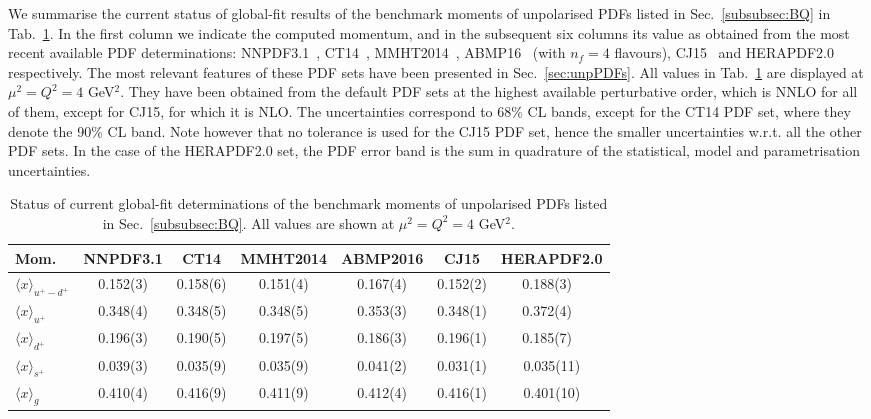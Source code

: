 We summarise the current status of global-fit results of the benchmark
moments of unpolarised PDFs listed in Sec.~\ref{subsubsec:BQ} 
in Tab.~\ref{tab:unpPDFmoms}.
%
In the first column we indicate the computed momentum, and in the subsequent 
six columns its value as obtained from the most recent available PDF 
determinations: NNPDF3.1~\cite{Ball:2017nwa},
CT14~\cite{Dulat:2015mca}, MMHT2014~\cite{Harland-Lang:2014zoa},
ABMP16~\cite{Alekhin:2017kpj} (with $n_f=4$ flavours), 
CJ15~\cite{Accardi:2016qay} and 
HERAPDF2.0~\cite{Abramowicz:2015mha} respectively.
%
The most relevant features of these PDF sets have been presented in 
Sec.~\ref{sec:unpPDFs}.
%
All values in Tab.~\ref{tab:unpPDFmoms} are displayed
at $\mu^2=Q^2=4$ GeV$^2$. 
%
They have been obtained from the default PDF sets at the highest available 
perturbative order, which is NNLO for all of them, except for CJ15, 
for which it is NLO.
%
The uncertainties correspond to 68\% CL bands, except for the CT14 PDF set,
where they denote the 90\% CL band.
%
Note however that no tolerance is used for the CJ15 PDF set, hence the 
smaller uncertainties w.r.t. all the other PDF sets.
%
In the case of the HERAPDF2.0 set, the PDF error band is the sum in quadrature 
of the statistical, model and parametrisation uncertainties.

\begin{table}[!t]
\centering
\renewcommand{\arraystretch}{1.2}
\begin{tabular}{lcccccc}
\toprule
Mom. 
& NNPDF3.1 & CT14 & MMHT2014 & ABMP2016 & CJ15 & HERAPDF2.0 \\
\midrule
$\langle x \rangle_{u^+-d^+}$ 
& 0.152(3) & 0.158(6) & 0.151(4) & 0.167(4) & 0.152(2) & 0.188(3)\ \,\\
$\langle x \rangle_{u^+}$    
& 0.348(4) & 0.348(5) & 0.348(5) & 0.353(3) & 0.348(1) & 0.372(4)\ \,\\
$\langle x \rangle_{d^+}$    
& 0.196(3) & 0.190(5) & 0.197(5) & 0.186(3) & 0.196(1) & 0.185(7)\ \,\\
$\langle x \rangle_{s^+}$    
& 0.039(3) & 0.035(9) & 0.035(9) & 0.041(2) & 0.031(1) & 0.035(11)\\
$\langle x \rangle_{g}$     
& 0.410(4) & 0.416(9) & 0.411(9) & 0.412(4) & 0.416(1) & 0.401(10)\\
\bottomrule
\end{tabular}
\caption{\small Status of current global-fit determinations of the 
benchmark moments of unpolarised PDFs listed in Sec.~\ref{subsubsec:BQ}.
All values are shown at $\mu^2=Q^2=4$ GeV$^2$.}
\label{tab:unpPDFmoms}
\end{table}

